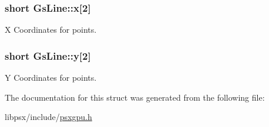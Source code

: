 \hypertarget{structGsLine_a9f199bc7586a8693bc1fe960aa019ba3}{}
\subsubsection[{x}]{\setlength{\rightskip}{0pt plus 5cm}short Gs\+Line\+::x\mbox{[}2\mbox{]}}\label{structGsLine_a9f199bc7586a8693bc1fe960aa019ba3}


X Coordinates for points. 

\hypertarget{structGsLine_ad9a2ccbd59395269d1a193f68e56d89e}{}
\subsubsection[{y}]{\setlength{\rightskip}{0pt plus 5cm}short Gs\+Line\+::y\mbox{[}2\mbox{]}}\label{structGsLine_ad9a2ccbd59395269d1a193f68e56d89e}


Y Coordinates for points. 



The documentation for this struct was generated from the following file\+:\begin{DoxyCompactItemize}
\item 
libpsx/include/\hyperlink{psxgpu_8h}{psxgpu.\+h}\end{DoxyCompactItemize}
